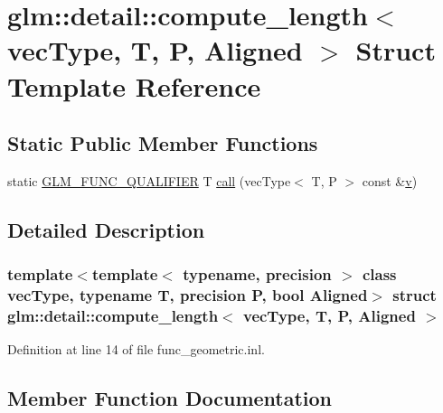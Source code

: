 \hypertarget{structglm_1_1detail_1_1compute__length}{}\section{glm\+::detail\+::compute\+\_\+length$<$ vec\+Type, T, P, Aligned $>$ Struct Template Reference}
\label{structglm_1_1detail_1_1compute__length}
\subsection*{Static Public Member Functions}
\begin{DoxyCompactItemize}
\item 
static \mbox{\hyperlink{setup_8hpp_a33fdea6f91c5f834105f7415e2a64407}{G\+L\+M\+\_\+\+F\+U\+N\+C\+\_\+\+Q\+U\+A\+L\+I\+F\+I\+ER}} T \mbox{\hyperlink{structglm_1_1detail_1_1compute__length_ad708612d3f5e08a063311daa4ee88798}{call}} (vec\+Type$<$ T, P $>$ const \&\mbox{\hyperlink{glad_8h_a14cfbe2fc2234f5504618905b69d1e06}{v}})
\end{DoxyCompactItemize}


\subsection{Detailed Description}
\subsubsection*{template$<$template$<$ typename, precision $>$ class vec\+Type, typename T, precision P, bool Aligned$>$\newline
struct glm\+::detail\+::compute\+\_\+length$<$ vec\+Type, T, P, Aligned $>$}



Definition at line 14 of file func\+\_\+geometric.\+inl.



\subsection{Member Function Documentation}
\mbox{\label{structglm_1_1detail_1_1compute__length_ad708612d3f5e08a063311daa4ee88798}} 
